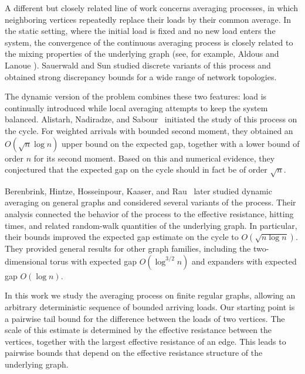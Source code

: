\documentclass[11pt]{article}
\numberwithin{equation}{section}
\newcommand{\1}{\mathbf{1}}
\begin{document}
\medskip

A different but closely related line of work concerns averaging
processes, in which neighboring vertices repeatedly replace their loads by their common average. In the static setting, where the initial load is fixed and no new load enters the system, the convergence of the continuous averaging process is closely related to the mixing properties of the underlying graph (see, for example, Aldous and Lanoue \cite{AldousLanoue}). Sauerwald and Sun \cite{SauerwaldSun} studied discrete variants of this process and obtained strong discrepancy bounds for a wide range of network topologies.

\medskip

The dynamic version of the problem combines these two features: load is continually introduced while local averaging attempts to keep the system balanced. Alistarh, Nadiradze, and Sabour~\cite{AlistarhNadiradzeSabour} initiated the study of this process on the cycle. For weighted arrivals with bounded second moment, they obtained an \(O(\sqrt n\log n)\) upper bound on the expected gap, together with a lower bound of order \(n\) for its second moment. Based on this and numerical evidence, they conjectured that the expected gap on the cycle should in fact be of order \(\sqrt n\).

\medskip

Berenbrink, Hintze, Hosseinpour, Kaaser, and Rau~\cite{BerenbrinkHintzeHosseinpourKaaserRau} later studied dynamic averaging on general graphs and considered several variants of the process. Their analysis connected the behavior of the process to the effective resistance, hitting times, and related random-walk quantities of the underlying graph. In particular, their bounds improved the expected gap estimate on the cycle to \(O(\sqrt{n \log n})\). They provided general results for other graph families, including the two-dimensional torus with expected gap $O(\log ^{3/2}n)$ and expanders with expected gap $O(\log n)$. 

\medskip

In this work we study the averaging process on finite regular graphs, allowing an arbitrary deterministic sequence of bounded arriving loads. Our starting point is a pairwise tail bound for the difference between the loads of two vertices. The scale of this estimate is determined by the effective resistance between the vertices, together with the largest effective resistance of an edge. This leads to pairwise bounds that depend on the effective resistance structure of the underlying graph.
\end{document}
